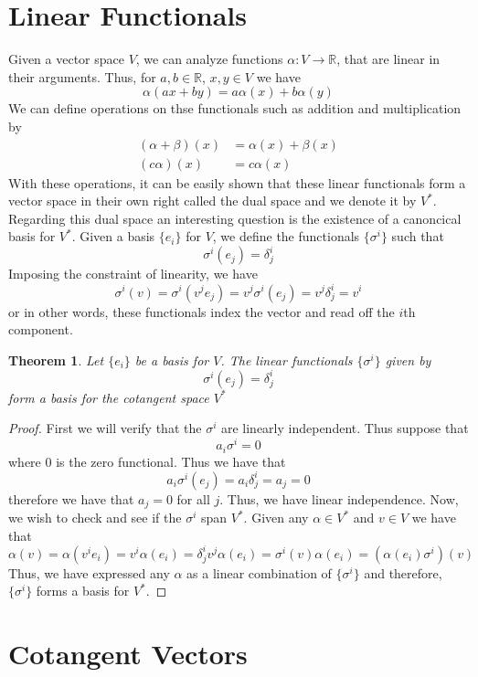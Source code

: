 \documentclass[a4paper]{article}
\newtheorem*{thm}{Theorem}
\begin{document}
\section*{Linear Functionals}%
Given a vector space $V$, we can analyze functions $\alpha: V \rightarrow \mathds{R}$, that are linear in their arguments. Thus, for $a,b \in \mathds{R}$, $x,y \in V$ we have
\[
  \alpha(a x + b y) = a \alpha(x) + b \alpha(y)
\]
We can define operations on thse functionals such as addition and multiplication by
\[
  \begin{aligned}
    (\alpha + \beta)(x) &= \alpha(x) + \beta(x) \\
    (c\alpha)(x) &= c\alpha(x)
  \end{aligned}
\]
With these operations, it can be easily shown that these linear functionals form a vector space in their own right called the dual space and we denote it by $V^*$. Regarding this dual space an interesting question is the existence of a canoncical basis for $V^*$. Given a basis $\{e_i\}$ for $V$, we define the functionals $\{\sigma^i\}$ such that
\[
  \sigma^i(e_j) = \delta^i_j
\]
Imposing the constraint of linearity, we have
\[
  \sigma^i(v) = \sigma^i \left( v^je_j \right) = v^j\sigma^i(e_j) = v^j \delta_j^i = v^i
\]
or in other words, these functionals index the vector and read off the $i$th component. 

\begin{thm}
  Let $\{e_i\}$ be a basis for $V$. The linear functionals $\{\sigma^i\}$ given by 
  \[
    \sigma^i(e_j) = \delta^i_j
  \]
  form a basis for the cotangent space $V^*$
\end{thm}

\begin{proof}
  First we will verify that the $\sigma^i$ are linearly independent. Thus suppose that
  \[
    a_i \sigma^i = 0
  \]
  where $0$ is the zero functional. Thus we have that
  \[
    a_i \sigma^i(e_j) = a_i \delta^i_j = a_j = 0
  \]
  therefore we have that $a_j = 0$ for all $j$. Thus, we have linear independence. Now, we wish to check and see if the $\sigma^i$ span $V^*$. Given any $\alpha \in V^*$ and $v \in V$ we have that
  \[
    \alpha(v) =  \alpha(v^ie_i) = v^i\alpha(e_i) = \delta_j^iv^j \alpha(e_i) = \sigma^i(v) \alpha(e_i) = (\alpha(e_i)\sigma^i)(v)
  \]
  Thus, we have expressed any $\alpha$ as a linear combination of $\{\sigma^i\}$ and therefore, $\{\sigma^i\}$ forms a basis for $V^*$.
\end{proof}



\section*{Cotangent Vectors}%
\end{document}
